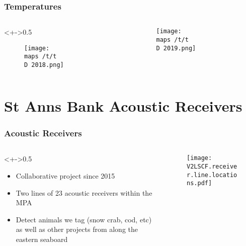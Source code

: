\documentclass{beamer}
\begin{document}

\begin{frame}
	
	\frametitle{Temperatures}
	\begin{columns}
		\begin{column}<+->{0.5\textwidth}
			\vspace*{-0.5cm}
			\begin{figure}
				\centerline{\texttt{[image: \\maps /t/t\\D 2018.png]}}
				
			\end{figure}
		\end{column}
		
		\begin{column}{0.5\textwidth}
			\begin{figure}
				\vspace*{-0.5cm}
				
				\centerline{\texttt{[image: \\maps /t/t\\D 2019.png]}}
				
			\end{figure}
			
		\end{column}
	\end{columns}
\end{frame}


\section{St Anns Bank Acoustic Receivers}

\begin{frame}
	
	\frametitle{Acoustic Receivers}
	\begin{columns}
		\begin{column}<+->{0.5\textwidth}
			\vspace*{-0.5cm}
			\begin{itemize}
				\item Collaborative project since 2015 
				\item Two lines of 23 acoustic receivers within the MPA
				\item Detect animals we tag (snow crab, cod, etc) as well as other projects from along the eastern seaboard
			\end{itemize}
		\end{column}
		
		\begin{column}{0.5\textwidth}
			\begin{figure}
				\vspace*{-0.5cm}
				
				\centerline{\texttt{[image: V2LSCF.receiver.line.locations.pdf]}}
				
			\end{figure}
			
		\end{column}
	\end{columns}
\end{frame}
\end{document}
